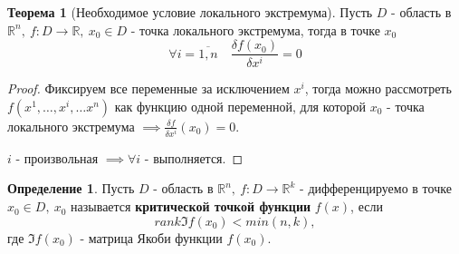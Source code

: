 \documentclass{report}
\theoremstyle{definition}
\newtheorem{definition}{Определение}[section]
\newtheorem{theorem}{Теорема}[section]
\begin{document}
\begin{theorem}[Необходимое условие локального экстремума]
  Пусть $D$ - область в $\mathbb{R}^n, \ f : D\rightarrow\mathbb{R}, \ x_0 \in D$ - точка локального экстремума, тогда в точке $x_0$
  \begin{equation*}
    \forall i = \overline{1,n} \quad \frac{\delta f(x_0)}{\delta x^i} = 0
  \end{equation*}
\end{theorem}

\begin{proof}
  Фиксируем все переменные за исключением $x^i$, тогда можно рассмотреть $f(x^1, \ldots, x^i, \ldots x^n)$ как функцию одной переменной, для которой $x_0$ - точка локального экстремума $\implies \frac{\delta f}{\delta x^i}(x_0) = 0$.

  $i$ - произвольная $\implies \forall i$ - выполняется.
\end{proof}

\begin{definition}
  Пусть $D$ - область в $\mathbb{R}^n, \ f:D\rightarrow\mathbb{R}^k$ - дифференцируемо в точке $x_0 \in D, \ x_0$ называется \textbf{критической точкой функции} $f(x)$, если
  \begin{equation*}
    rank \mathfrak{I} f(x_0) < min(n,k),
  \end{equation*}
  где $\mathfrak{I} f(x_0)$ - матрица Якоби функции $f(x_0)$.
\end{definition}
\end{document}
